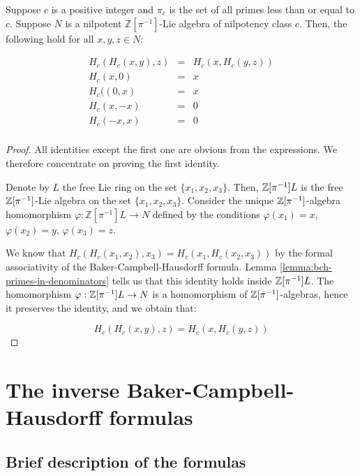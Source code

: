 \begin{theorem}\label{thm:bch-group-axiom-universal-validity-pi-powered}
  Suppose $c$ is a positive integer and $\pi_c$ is the set of all primes
  less than or equal to $c$. Suppose $N$ is a nilpotent
  $\mathbb{Z}[\pi^{-1}]$-Lie algebra of nilpotency class $c$. Then, the
  following hold for all $x,y,z \in N$:
    
  \begin{eqnarray*}
    H_c(H_c(x,y),z) & = & H_c(x,H_c(y,z)) \\
    H_c(x,0) & = & x \\
    H_c((0,x) & = & x\\
    H_c(x,-x) & = & 0 \\
    H_c(-x,x) & = & 0 \\
  \end{eqnarray*}

\end{theorem}

\begin{proof}
  All identities except the first one are obvious from the
  expressions. We therefore concentrate on proving the first identity.

  Denote by $L$ the free Lie ring on the set $\{
  x_1,x_2,x_3 \}$. Then, $\mathbb{Z}[\pi^{-1}]L$ is the free
  $\mathbb{Z}[\pi^{-1}]$-Lie algebra on the set $\{ x_1,x_2,x_3 \}$. Consider
  the unique $\mathbb{Z}[\pi^{-1}]$-algebra homomorphism $\varphi:
  \mathbb{Z}[\pi^{-1}]L \to N$ defined by the conditions $\varphi(x_1)
  = x$, $\varphi(x_2) = y$, $\varphi(x_3) = z$.

  We know that $H_c(H_c(x_1,x_2),x_3) = H_c(x_1,H_c(x_2,x_3))$ by the
  formal associativity of the Baker-Campbell-Hausdorff formula. Lemma
  \ref{lemma:bch-primes-in-denominators} tells us that this identity
  holds inside $\mathbb{Z}[\pi^{-1}]L$. The homomorphism $\varphi:
  \mathbb{Z}[\pi^{-1}]L \to N$ is a homomorphism of $\mathbb{Z}[\pi^{-1}]$-algebras,
  hence it preserves the identity, and we obtain that:

  $$H_c(H_c(x,y),z) = H_c(x,H_c(y,z))$$
\end{proof}



\section{The inverse Baker-Campbell-Hausdorff formulas}\label{sec:inverse-bch}

\subsection{Brief description of the formulas}


